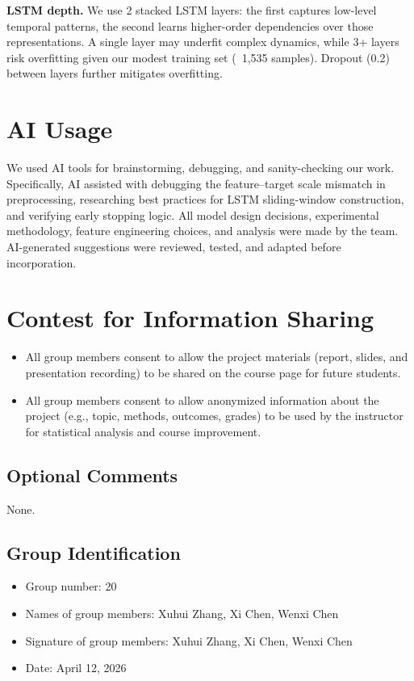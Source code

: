 \documentclass{article}
\begin{document}
\textbf{LSTM depth.} We use 2 stacked LSTM layers: the first captures low-level temporal patterns, the second learns higher-order dependencies over those representations. A single layer may underfit complex dynamics, while 3+ layers risk overfitting given our modest training set (~1,535 samples). Dropout (0.2) between layers further mitigates overfitting.


\section*{AI Usage}

We used AI tools for brainstorming, debugging, and sanity-checking our work. Specifically, AI assisted with debugging the feature--target scale mismatch in preprocessing, researching best practices for LSTM sliding-window construction, and verifying early stopping logic. All model design decisions, experimental methodology, feature engineering choices, and analysis were made by the team. AI-generated suggestions were reviewed, tested, and adapted before incorporation.

\section*{Contest for Information Sharing}

\begin{itemize}
	\item All group members consent to allow the project materials (report, slides, and presentation recording) to be shared on the course page for future students.
\end{itemize}

\begin{itemize}
	\item All group members consent to allow anonymized information about the project (e.g., topic, methods, outcomes, grades) to be used by the instructor for statistical analysis and course improvement.
\end{itemize}

\subsection*{Optional Comments}
None.

\subsection*{Group Identification}

\begin{itemize}
	\item Group number: 20
	\item Names of group members: Xuhui Zhang, Xi Chen, Wenxi Chen
	\item Signature of group members: Xuhui Zhang, Xi Chen, Wenxi Chen
	\item Date: April 12, 2026
\end{itemize}
\end{document}
